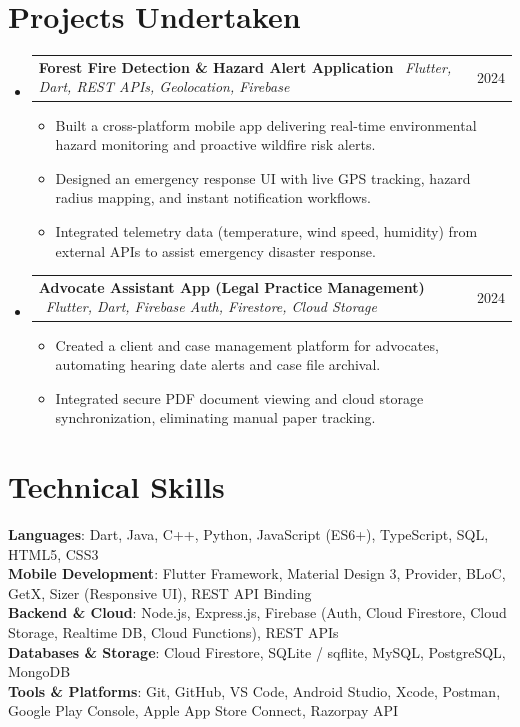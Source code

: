 \documentclass[letterpaper,10pt]{article}
\makeatletter
\newcommand{\resumeItem}[1]{
  \item\small{
    {#1 \vspace{-1.5pt}}
  }
}
\newcommand{\resumeProjectHeading}[2]{
    \vspace{-1.5pt}\item
    \begin{tabular*}{0.97\textwidth}{l@{\extracolsep{\fill}}r}
      \small#1 & #2 \\
    \end{tabular*}\vspace{-4pt}
}
\newcommand{\resumeSubHeadingListStart}{\begin{itemize}[leftmargin=0.15in, label={}]}
\newcommand{\resumeSubHeadingListEnd}{\end{itemize}}
\newcommand{\resumeItemListStart}{\begin{itemize}[leftmargin=0.15in]}
\newcommand{\resumeItemListEnd}{\end{itemize}\vspace{-4pt}}
\makeatother
\begin{document}
\section{Projects Undertaken}
    \resumeSubHeadingListStart
      \resumeProjectHeading
          {\textbf{Forest Fire Detection \& Hazard Alert Application} \textbar\ \emph{Flutter, Dart, REST APIs, Geolocation, Firebase}}{2024}
          \resumeItemListStart
            \resumeItem{Built a cross-platform mobile app delivering real-time environmental hazard monitoring and proactive wildfire risk alerts.}
            \resumeItem{Designed an emergency response UI with live GPS tracking, hazard radius mapping, and instant notification workflows.}
            \resumeItem{Integrated telemetry data (temperature, wind speed, humidity) from external APIs to assist emergency disaster response.}
          \resumeItemListEnd
      \resumeProjectHeading
          {\textbf{Advocate Assistant App (Legal Practice Management)} \textbar\ \emph{Flutter, Dart, Firebase Auth, Firestore, Cloud Storage}}{2024}
          \resumeItemListStart
            \resumeItem{Created a client and case management platform for advocates, automating hearing date alerts and case file archival.}
            \resumeItem{Integrated secure PDF document viewing and cloud storage synchronization, eliminating manual paper tracking.}
          \resumeItemListEnd
    \resumeSubHeadingListEnd

\section{Technical Skills}
 \begin{itemize}[leftmargin=0.15in, label={}]
    \small{\item{
     \textbf{Languages}{: Dart, Java, C++, Python, JavaScript (ES6+), TypeScript, SQL, HTML5, CSS3} \\
     \textbf{Mobile Development}{: Flutter Framework, Material Design 3, Provider, BLoC, GetX, Sizer (Responsive UI), REST API Binding} \\
     \textbf{Backend \& Cloud}{: Node.js, Express.js, Firebase (Auth, Cloud Firestore, Cloud Storage, Realtime DB, Cloud Functions), REST APIs} \\
     \textbf{Databases \& Storage}{: Cloud Firestore, SQLite / sqflite, MySQL, PostgreSQL, MongoDB} \\
     \textbf{Tools \& Platforms}{: Git, GitHub, VS Code, Android Studio, Xcode, Postman, Google Play Console, Apple App Store Connect, Razorpay API}
    }}
 \end{itemize}
\end{document}
